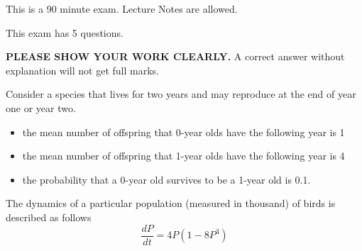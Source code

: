 \documentclass[12pt]{exam}
\begin{document}
\vspace{.5in}

This is a 90 minute exam. Lecture Notes are allowed.

\vspace{.2in} This exam has 5 questions.

\vspace{.2in} {\bf \Large PLEASE SHOW YOUR WORK CLEARLY.} A correct answer without explanation will not get full marks. \vspace{.5in}
\begin{center}
\gradetable[v]
\end{center}



\newpage



\begin{questions}
\question[15]
Consider a species that lives for two years and may reproduce at the end of year one or
year two. 
\begin{itemize}
\item the mean number of offspring that 0-year olds have the following year is 1
\item the mean number of offspring that 1-year olds have the following year is 4
\item the probability that a 0-year old survives to be a 1-year old is 0.1.
\end{itemize}


\question[10]
The dynamics of a particular population (measured in thousand) of birds is described as follows
$$\frac{dP}{dt}=4P(1-8P^3)$$
\begin{parts}

\end{parts}
\end{questions}
\end{document}

